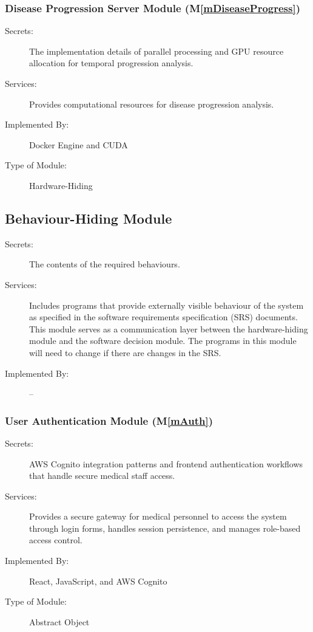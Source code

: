 \documentclass[12pt, titlepage]{article}
\newcommand{\mref}[1]{M\ref{#1}}
\begin{document}
\subsubsection{Disease Progression Server Module (\mref{mDiseaseProgress})}
\begin{description}
\item[Secrets:] The implementation details of parallel processing and GPU resource allocation for temporal progression analysis.
\item[Services:] Provides computational resources for disease progression analysis.
\item[Implemented By:] Docker Engine and CUDA
\item[Type of Module:] Hardware-Hiding
\end{description}

\subsection{Behaviour-Hiding Module}

\begin{description}
\item[Secrets:]The contents of the required behaviours.
\item[Services:]Includes programs that provide externally visible behaviour of
  the system as specified in the software requirements specification (SRS)
  documents. This module serves as a communication layer between the
  hardware-hiding module and the software decision module. The programs in this
  module will need to change if there are changes in the SRS.
\item[Implemented By:] --
\end{description}

\subsubsection{User Authentication Module (\mref{mAuth})}
\begin{description}
\item[Secrets:] AWS Cognito integration patterns and frontend authentication workflows that handle secure medical staff access.
\item[Services:] Provides a secure gateway for medical personnel to access the system through login forms, handles session persistence, and manages role-based access control.
\item[Implemented By:] React, JavaScript, and AWS Cognito
\item[Type of Module:] Abstract Object
\end{description}
\end{document}

